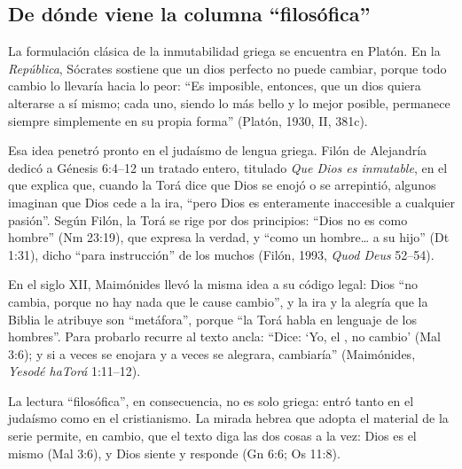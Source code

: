 
\subsection{De dónde viene la columna “filosófica”}
La formulación clásica de la inmutabilidad griega se encuentra en Platón. En la \emph{República}, Sócrates sostiene que un dios perfecto no puede cambiar, porque todo cambio lo llevaría hacia lo peor: ``Es imposible, entonces, que un dios quiera alterarse a sí mismo; cada uno, siendo lo más bello y lo mejor posible, permanece siempre simplemente en su propia forma'' (Platón, 1930, II, 381c).

Esa idea penetró pronto en el judaísmo de lengua griega. Filón de Alejandría dedicó a Génesis 6:4--12 un tratado entero, titulado \emph{Que Dios es inmutable}, en el que explica que, cuando la Torá dice que Dios se enojó o se arrepintió, algunos imaginan que Dios cede a la ira, ``pero Dios es enteramente inaccesible a cualquier pasión''. Según Filón, la Torá se rige por dos principios: ``Dios no es como hombre'' (Nm 23:19), que expresa la verdad, y ``como un hombre\ldots{} a su hijo'' (Dt 1:31), dicho ``para instrucción'' de los muchos (Filón, 1993, \emph{Quod Deus} 52--54).

En el siglo XII, Maimónides llevó la misma idea a su código legal: Dios ``no cambia, porque no hay nada que le cause cambio'', y la ira y la alegría que la Biblia le atribuye son ``metáfora'', porque ``la Torá habla en lenguaje de los hombres''. Para probarlo recurre al texto ancla: ``Dice: `Yo, el \SENOR, no cambio' (Mal 3:6); y si a veces se enojara y a veces se alegrara, cambiaría'' (Maimónides, \emph{Yesodé haTorá} 1:11--12).

La lectura ``filosófica'', en consecuencia, no es solo griega: entró tanto en el judaísmo como en el cristianismo. La mirada hebrea que adopta el material de la serie permite, en cambio, que el texto diga las dos cosas a la vez: Dios es el mismo (Mal 3:6), y Dios siente y responde (Gn 6:6; Os 11:8).

